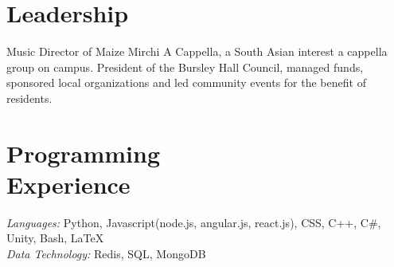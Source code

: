 \documentclass[margin,line]{resume}
\begin{document}
\begin{resume}
   \section{\mysidestyle Leadership}
    Music Director of Maize Mirchi A Cappella, a South Asian interest a cappella group on campus. President of the Bursley Hall Council, managed funds, sponsored local organizations and led community events for the benefit of residents. 
\vspace{-2mm}

    \section{\mysidestyle Programming\\Experience}

    \emph{Languages:} Python, Javascript(node.js, angular.js, react.js), CSS, C++, C\#, Unity, Bash, \LaTeX \\
    \emph{Data Technology:} Redis, SQL, MongoDB
\end{resume}
\end{document}
